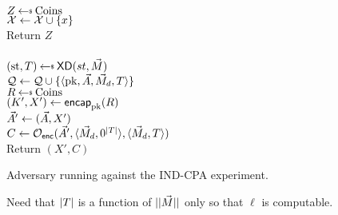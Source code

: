 \begin{figure}[tbhp]
\begin{center}
{\\
  $Z \getsr \mathrm{Coins}$\\
  $\mathcal{X} \gets \mathcal{X} \cup \{x\}$\\
  Return $Z$\\

\\
$(\st, \umd) \getsr \mdalg(st,\vmsg)$\\
$\mathcal{Q} \gets \mathcal{Q} \cup \{\langle \mathrm{pk},\vec{A},\vec{M}_d,T\rangle\}$\\
$R \getsr \mathrm{Coins}$\\
$(K',X') \gets \mathsf{encap}_{\mathrm{pk}}^{}(R)$\\
$\vec{A}' \gets (\vec{A}, X')$\\
$C \gets \mathcal{O}_{\mathsf{enc}}(\vec{A}', \langle \vec{M}_d,0^{|T|}\rangle, \langle \vec{M}_d,T\rangle)$\\
Return $(X',C)$\\
}
\caption{Adversary running against the IND-CPA experiment.}
\label{fig:CPA-KDadv}
\end{center}
\end{figure}

\begin{figure}
\begin{center}
\caption{Need that $|T|$ is a function of $||\vec{M}||$ only so that $\ell$ is computable.}
\end{center}
\end{figure}